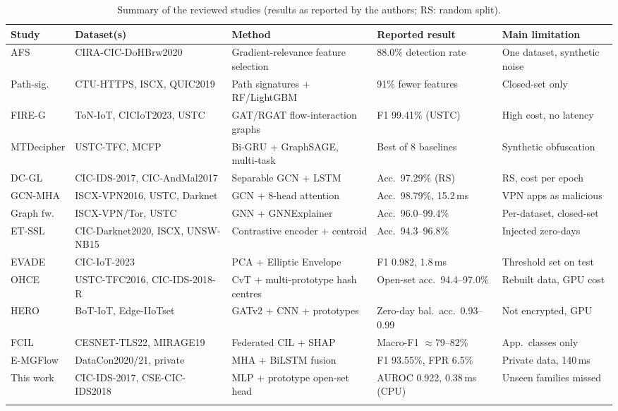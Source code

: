 \documentclass[pdflatex,sn-mathphys-num,iicol]{sn-jnl}%
\newcommand{\ms}{\,ms}
\begin{document}
\begin{table}[t]
\caption{Summary of the reviewed studies (results as reported by the authors; RS: random split).}\label{tab:related}
\footnotesize
\setlength{\tabcolsep}{3pt}
\begin{tabular}{@{}L{1.8cm}L{3.2cm}L{3.5cm}L{3.0cm}L{3.2cm}@{}}
\toprule
Study & Dataset(s) & Method & Reported result & Main limitation \\
\midrule
AFS \cite{lee2026afs} & CIRA-CIC-DoHBrw2020 & Gradient-relevance feature selection & 88.0\% detection rate & One dataset, synthetic noise \\
Path-sig.\ \cite{xu2025pathsig} & CTU-HTTPS, ISCX, QUIC2019 & Path signatures + RF/LightGBM & 91\% fewer features & Closed-set only \\
FIRE-G \cite{liu2026fireg} & ToN-IoT, CICIoT2023, USTC & GAT/RGAT flow-interaction graphs & F1 99.41\% (USTC) & High cost, no latency \\
MTDecipher \cite{li2026mtdecipher} & USTC-TFC, MCFP & Bi-GRU + GraphSAGE, multi-task & Best of 8 baselines & Synthetic obfuscation \\
DC-GL \cite{yuan2025dcgl} & CIC-IDS-2017, CIC-AndMal2017 & Separable GCN + LSTM & Acc.\ 97.29\% (RS) & RS, cost per epoch \\
GCN-MHA \cite{liu2025gcnmha} & ISCX-VPN2016, USTC, Darknet & GCN + 8-head attention & Acc.\ 98.79\%, 15.2\ms & VPN apps as malicious \\
Graph fw.\ \cite{okonkwo2025graph} & ISCX-VPN/Tor, USTC & GNN + GNNExplainer & Acc.\ 96.0--99.4\% & Per-dataset, closed-set \\
ET-SSL \cite{sattar2025etssl} & CIC-Darknet2020, ISCX, UNSW-NB15 & Contrastive encoder + centroid & Acc.\ 94.3--96.8\% & Injected zero-days \\
EVADE \cite{haynes2025evade} & CIC-IoT-2023 & PCA + Elliptic Envelope & F1 0.982, 1.8\ms & Threshold set on test \\
OHCE \cite{yang2026ohce} & USTC-TFC2016, CIC-IDS-2018-R & CvT + multi-prototype hash centres & Open-set acc.\ 94.4--97.0\% & Rebuilt data, GPU cost \\
HERO \cite{cevallos2025hero} & BoT-IoT, Edge-IIoTset & GATv2 + CNN + prototypes & Zero-day bal.\ acc.\ 0.93--0.99 & Not encrypted, GPU \\
FCIL \cite{carillo2025fcil} & CESNET-TLS22, MIRAGE19 & Federated CIL + SHAP & Macro-F1 $\approx$79--82\% & App.\ classes only \\
E-MGFlow \cite{wu2025emgflow} & DataCon2020/21, private & MHA + BiLSTM fusion & F1 93.55\%, FPR 6.5\% & Private data, 140\ms \\
\midrule
This work & CIC-IDS-2017, CSE-CIC-IDS2018 & MLP + prototype open-set head & AUROC 0.922, 0.38\ms{} (CPU) & Unseen families missed \\
\botrule
\end{tabular}
\end{table}
\end{document}

